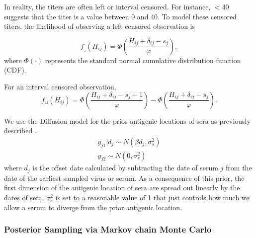 \documentclass[11pt,oneside,letterpaper]{article}
\newcommand{\se}{s}									%
\newcommand{\threshold}{f_{\textstyle \lrcorner}}	%
\newcommand{\interval}{f_{\sqcup}}					%
\newcommand{\mdssd}{\varphi}						%
\begin{document}
 In reality, the titers are often left or interval censored. For instance, $<40$ suggests that the titer is a value between 0 and 40. To model these censored titers, the likelihood of observing a left censored observation is 

\begin{equation} 
	\threshold(H_{ij}) = \Phi \left( \frac{ H_{ij} + \delta_{ij} - \se_j }{ \mdssd } \right),
\end{equation}
where $\Phi(\cdot)$ represents the standard normal cumulative distribution function (CDF).

For an interval censored observation,
\begin{equation} 
	\interval(H_{ij}) = \Phi \left( \frac{ H_{ij} + \delta_{ij} - \se_j + 1 }{ \mdssd } \right) - \Phi \left( \frac{ H_{ij} + \delta_{ij} - \se_j }{\mdssd} \right).
\end{equation}



We use the Diffusion model for the prior antigenic locations of sera as previously described \cite{bedford_integrating_2014}. 
\begin{eqnarray}
	y_{j1} | d_j \sim N ( \beta d_j, \sigma^2_s )  \\
	y_{j2}  \sim N(0, \sigma^2_s)
\end{eqnarray}
where $d_j$ is the offset date calculated by subtracting the date of serum $j$ from the date of the earliest sampled virus or serum. 
As a consequence of this prior, the first dimension of the antigenic location of sera are spread out linearly by the dates of sera. 
$\sigma^2_s$ is set to a reasonable value of 1 that just controls how much we allow a serum to diverge from the prior antigenic location.



\subsubsection*{Posterior Sampling via Markov chain Monte Carlo}
\end{document}
